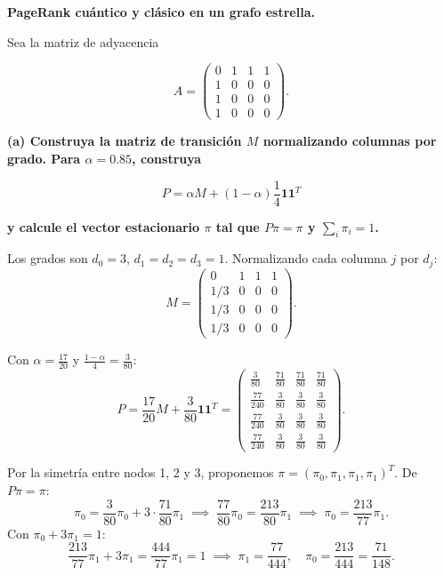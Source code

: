 {\bfseries PageRank cuántico y clásico en un grafo estrella.

Sea la matriz de adyacencia

$$
    A =
    \begin{pmatrix}
        0 & 1 & 1 & 1 \\
        1 & 0 & 0 & 0 \\
        1 & 0 & 0 & 0 \\
        1 & 0 & 0 & 0
    \end{pmatrix}.
$$
}

{\bfseries (a) Construya la matriz de transición $M$ normalizando columnas por grado. Para $\alpha=0.85$, construya}

$$
    P = \alpha M + (1-\alpha)\frac{1}{4}\mathbf{1}\mathbf{1}^T
$$

{\bfseries y calcule el vector estacionario $\pi$ tal que $P\pi = \pi$ y $\sum_i \pi_i = 1$.}

Los grados son $d_0 = 3$, $d_1 = d_2 = d_3 = 1$. Normalizando cada columna $j$ por $d_j$:
$$
    M = \begin{pmatrix}
        0   & 1 & 1 & 1 \\
        1/3 & 0 & 0 & 0 \\
        1/3 & 0 & 0 & 0 \\
        1/3 & 0 & 0 & 0
    \end{pmatrix}.
$$

Con $\alpha = \tfrac{17}{20}$ y $\tfrac{1-\alpha}{4} = \tfrac{3}{80}$:
$$
    P = \frac{17}{20}M + \frac{3}{80}\mathbf{1}\mathbf{1}^T = \begin{pmatrix}
        \tfrac{3}{80}   & \tfrac{71}{80} & \tfrac{71}{80} & \tfrac{71}{80} \\[4pt]
        \tfrac{77}{240} & \tfrac{3}{80}  & \tfrac{3}{80}  & \tfrac{3}{80}  \\[4pt]
        \tfrac{77}{240} & \tfrac{3}{80}  & \tfrac{3}{80}  & \tfrac{3}{80}  \\[4pt]
        \tfrac{77}{240} & \tfrac{3}{80}  & \tfrac{3}{80}  & \tfrac{3}{80}
    \end{pmatrix}.
$$

Por la simetría entre nodos 1, 2 y 3, proponemos $\pi = (\pi_0, \pi_1, \pi_1, \pi_1)^T$. De $P\pi = \pi$:
$$
    \pi_0 = \frac{3}{80}\pi_0 + 3 \cdot \frac{71}{80}\pi_1 \;\implies\; \frac{77}{80}\pi_0 = \frac{213}{80}\pi_1 \;\implies\; \pi_0 = \frac{213}{77}\pi_1.
$$
Con $\pi_0 + 3\pi_1 = 1$:
$$
    \frac{213}{77}\pi_1 + 3\pi_1 = \frac{444}{77}\pi_1 = 1 \;\implies\; \pi_1 = \frac{77}{444}, \quad \pi_0 = \frac{213}{444} = \frac{71}{148}.
$$

